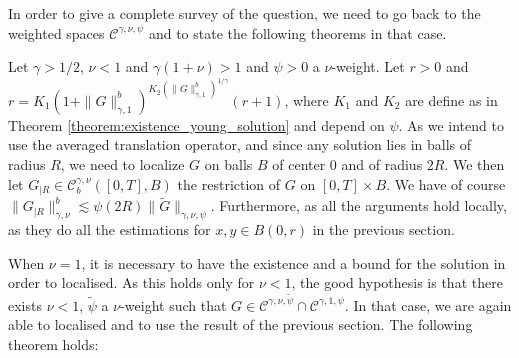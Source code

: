 \documentclass[a4paper,11pt]{article}
\newcommand{\CC}{\mathscr C}
\begin{document}
In order to give a complete survey of the question, we need to go back to the
weighted spaces $\CC^{\gamma , \nu , \psi}$ and to state the following
theorems in that case.

Let $\gamma >1/2$, $\nu <1$ and $\gamma ( 1+ \nu ) >1$ and $\psi >0$ a
$\nu$-weight. Let $r>0$ and $r=K_{1} ( 1+ \| G \|_{\gamma ,1}^{b} )^{K_{2} (
\| G \|^{b}_{\gamma ,1} )^{1/ \gamma}} ( r+1 )$, where $K_{1}$ and $K_{2}$ are
define as in Theorem \ref{theorem:existence_young_solution} and depend on
$\psi$. As we intend to use the averaged translation operator, and since any
solution lies in balls of radius $R$, we need to localize $G$ on balls $B$ of
center $0$ and of radius $2R$. We then let $G_{|R} \in \CC^{\gamma , \nu}_{ b}
( [ 0,T ] ,B )$ the restriction of $G$ on $[ 0,T ] \times B$. We have of
course $\| G_{|R} \|^{b}_{\gamma , \nu} \lesssim \psi ( 2R ) \| \tilde{G}
\|_{\gamma , \nu , \psi}$. Furthermore, as all the arguments hold locally, as
they do all the estimations for $x,y \in B ( 0,r )$ in the previous section.

When $\nu =1$, it is necessary to have the existence and a bound for the
solution in order to localised. As this holds only for $\nu <1$, the good
hypothesis is that there exists $\nu <1$, $\tilde{\psi}$ a $\nu$-weight such
that $G \in \CC^{\gamma , \nu , \tilde{\psi}} \cap \CC^{\gamma ,1, \psi}$. In
that case, we are again able to localised and to use the result of the
previous section. The following theorem holds:
\end{document}
